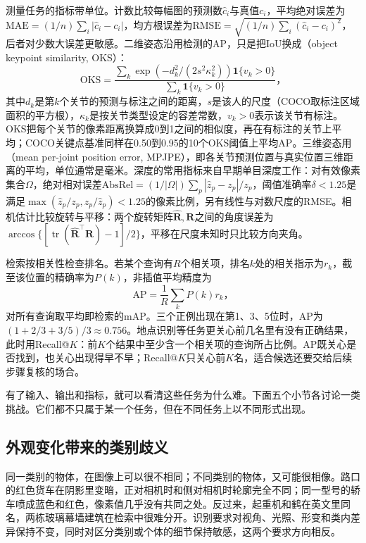 测量任务的指标带单位。计数比较每幅图的预测数$\hat c_i$与真值$c_i$，平均绝对误差为$\mathrm{MAE}=(1/n)\sum_i|\hat c_i-c_i|$，均方根误差为$\mathrm{RMSE}=\sqrt{(1/n)\sum_i(\hat c_i-c_i)^2}$，后者对少数大误差更敏感。二维姿态沿用检测的AP，只是把IoU换成（object keypoint similarity, OKS）：
\begin{equation}
 \mathrm{OKS}=
 \frac{\sum_k\exp\!\left(-d_k^2/(2s^2\kappa_k^2)\right)\mathbf 1\{v_k>0\}}
      {\sum_k\mathbf 1\{v_k>0\}}\text{，}
 \label{eq:vision-oks}
\end{equation}
其中$d_k$是第$k$个关节的预测与标注之间的距离，$s$是该人的尺度（COCO取标注区域面积的平方根），$\kappa_k$是按关节类型设定的容差常数，$v_k>0$表示该关节有标注。OKS把每个关节的像素距离换算成0到1之间的相似度，再在有标注的关节上平均；COCO关键点基准同样在0.50到0.95的10个OKS阈值上平均AP。三维姿态用（mean per-joint position error, MPJPE），即各关节预测位置与真实位置三维距离的平均，单位通常是毫米。深度的常用指标来自早期单目深度工作：对有效像素集合$\Omega$，绝对相对误差$\mathrm{AbsRel}=(1/|\Omega|)\sum_p|\hat z_p-z_p|/z_p$，阈值准确率$\delta<1.25$是满足$\max(\hat z_p/z_p,z_p/\hat z_p)<1.25$的像素比例，另有线性与对数尺度的RMSE。相机估计比较旋转与平移：两个旋转矩阵$\hat{\bm R},\bm R$之间的角度误差为$\arccos\{[\operatorname{tr}(\hat{\bm R}^\top\bm R)-1]/2\}$，平移在尺度未知时只比较方向夹角。

检索按相关性检查排名。若某个查询有$R$个相关项，排名$k$处的相关指示为$r_k$，截至该位置的精确率为$P(k)$，非插值平均精度为
\begin{equation}
 \mathrm{AP}=\frac1R\sum_k P(k)r_k\text{，}
 \label{eq:vision-retrieval-ap}
\end{equation}
对所有查询取平均即检索的mAP。三个正例出现在第1、3、5位时，AP为$(1+2/3+3/5)/3\approx0.756$。地点识别等任务更关心前几名里有没有正确结果，此时用Recall@$K$：前$K$个结果中至少含一个相关项的查询所占比例。AP既关心是否找到，也关心出现得早不早；Recall@$K$只关心前$K$名，适合候选还要交给后续步骤复核的场合。

有了输入、输出和指标，就可以看清这些任务为什么难。下面五个小节各讨论一类挑战。它们都不只属于某一个任务，但在不同任务上以不同形式出现。

\subsection{外观变化带来的类别歧义}
\label{sec:vision-recognition-challenge-appearance}

同一类别的物体，在图像上可以很不相同；不同类别的物体，又可能很相像。路口的红色货车在阴影里变暗，正对相机时和侧对相机时轮廓完全不同；同一型号的轿车喷成蓝色和红色，像素值几乎没有共同之处。反过来，起重机和鹤在英文里同名，两栋玻璃幕墙建筑在检索中很难分开。识别要求对视角、光照、形变和类内差异保持不变，同时对区分类别或个体的细节保持敏感，这两个要求方向相反。

